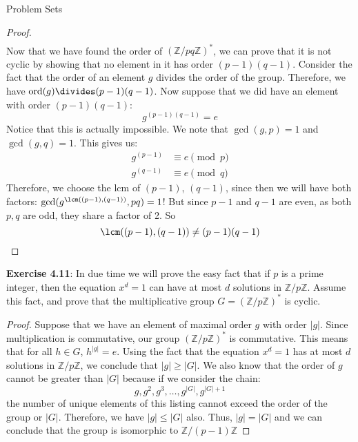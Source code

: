 \documentclass{report}
\begin{document}
\begin{exercises}{Problem Sets}
\begin{proof}
\begin{align*}
                \end{align*}
            Now that we have found the order of $(\mathbb{Z}/pq\mathbb{Z})^{*}$, we can prove that it is not cyclic by showing that no element in it has order $(p - 1)(q - 1)$. Consider the fact that the order of an element $g$ divides the order of the group. Therefore, we have $\text{ord}(g) \divides (p - 1)(q - 1)$. Now suppose that we did have an element with order $(p - 1)(q - 1)$:
            \begin{equation*}
                g^{(p - 1)(q - 1)} = e
            \end{equation*}
            Notice that this is actually impossible. We note that $\gcd(g, p) = 1$ and $\gcd(g, q) = 1$. This gives us:
            \begin{align*}
                g^{(p - 1)} &\equiv  e \pmod{p} \\
                g^{(q - 1)} &\equiv   e \pmod{q}   
            \end{align*}
            Therefore, we choose the lcm of $(p - 1)$, $(q - 1)$, since then we will have both factors: $\gcd(g^{\lcm((p - 1), (q - 1))}, pq) = 1$! But since $p - 1$ and $q - 1$ are even, as both $p, q$ are odd, they share a factor of 2. So
            \begin{equation*}
                \lcm((p - 1), (q - 1)) \neq (p - 1)(q  - 1)
            \end{equation*}
        \end{proof}

    \textbf{Exercise 4.11}: In due time we will prove the easy fact that if $p$ is a prime integer, then the equation $x^{d} = 1$ can have at most $d$ solutions in $\mathbb{Z}/p\mathbb{Z}$. Assume this fact, and prove that the multiplicative group $G = (\mathbb{Z}/p\mathbb{Z})^{*}$ is cyclic.
        \begin{proof}
            Suppose that we have an element of maximal order $g$ with order $\lvert g \rvert$. Since multiplication is commutative, our group $(\mathbb{Z}/p\mathbb{Z})^{*}$ is commutative. This means that for all $h \in G$, $h^{\lvert g \rvert} = e$. Using the fact that the equation $x^{d} = 1$ has at most $d$ solutions in $\mathbb{Z}/p\mathbb{Z}$, we conclude that $\lvert g \rvert \geq \lvert G \rvert$. We also know that the order of $g$ cannot be greater than $\lvert G \rvert$ because if we consider the chain:
            \begin{equation*}
                g, g^{2}, g^{3}, \ldots, g^{\lvert G \rvert}, g^{\lvert G \rvert + 1}
            \end{equation*}
        the number of unique elements of this listing cannot exceed the order of the group or $\lvert G \rvert$. Therefore, we have $\lvert g \rvert \leq \lvert G \rvert$ also. Thus, $\lvert g \rvert = \lvert G \rvert$ and we can conclude that the group is isomorphic to $\mathbb{Z}/(p - 1)\mathbb{Z}$
        \end{proof}


\end{exercises}
\end{document}
